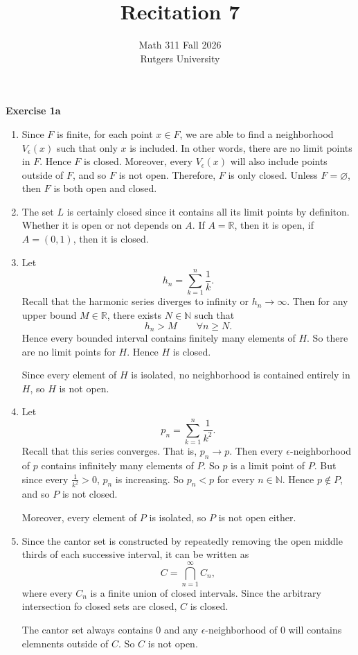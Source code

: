 \documentclass[12pt]{article}
\title{Recitation 7}
\author{Math 311 Fall 2026 \\ Rutgers University}
\date{}
\begin{document}
\maketitle

\textbf{Exercise 1a}
\begin{enumerate}[label=(\roman*)]
    \item Since \( F \) is finite, for each point \( x \in F \), we are able to find
          a neighborhood \( V_{\epsilon}(x) \) such that only \( x \) is included.
          In other words, there are no limit points in \( F \).
          Hence \( F \) is closed. Moreover, every \( V_{\epsilon}(x) \) will also include points
          outside of \( F \), and so \( F \) is not open. Therefore, \( F \) is only closed.
          Unless \( F = \varnothing \), then \( F \) is both open and closed.

    \item The set \( L \) is certainly closed since it contains all its limit points by definiton.
          Whether it is open or not depends on \( A \). If \( A = \mathbb{R}\), then it is open, if \( A = (0,1) \), then it is closed.


    \item Let
          \[
              h_n = \sum_{k=1}^{n} \frac{1}{k}.
          \]
          Recall that the harmonic series diverges to infinity or \( h_{n} \to \infty  \). Then for any upper bound \( M \in \mathbb{R}\), there exists \( N  \in \mathbb{N} \) such that
          \[
              h_n > M \qquad \forall n \geq N.
          \]
          Hence every bounded interval contains finitely many elements of \( H \).
          So there are no limit points for \( H \). Hence \( H \) is closed.

          Since every element of \( H \) is isolated, no neighborhood is contained entirely in \( H \), so \( H \) is not open.


    \item Let
          \[
              p_n = \sum_{k=1}^{n} \frac{1}{k^2}.
          \]
          Recall that this series converges. That is, \( p_n \to p \).
          Then every \( \epsilon \)-neighborhood of \( p \) contains infinitely many elements of \( P \). So \( p \) is a limit point of \( P \).
          But since every \( \frac{1}{k^2} > 0 \), \( p_n \) is increasing.
          So \( p_n < p \) for every \( n \in \mathbb{N} \). Hence \( p \not \in P \),
          and so \( P \) is not closed.

          Moreover, every element of \( P \) is isolated, so \( P \) is not open either.


    \item Since the cantor set is constructed by repeatedly removing the open middle thirds of each successive interval, it can be written as
          \[
              C = \bigcap_{n=1}^{\infty} C_n,
          \]
          where every \( C_n \) is a finite union of closed intervals.
          Since the arbitrary intersection fo closed sets are closed, \( C \) is closed.

          The cantor set always contains \( 0 \) and any \( \epsilon \)-neighborhood of 0 will contains elemnents outside of \( C \). So \( C \) is not open.
\end{enumerate}
\end{document}
